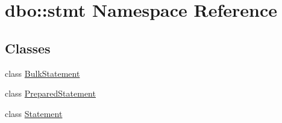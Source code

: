 \hypertarget{namespacedbo_1_1stmt}{\section{dbo\+:\+:stmt Namespace Reference}
\label{namespacedbo_1_1stmt}
}
\subsection*{Classes}
\begin{DoxyCompactItemize}
\item 
class \hyperlink{classdbo_1_1stmt_1_1_bulk_statement}{Bulk\+Statement}
\item 
class \hyperlink{classdbo_1_1stmt_1_1_prepared_statement}{Prepared\+Statement}
\item 
class \hyperlink{classdbo_1_1stmt_1_1_statement}{Statement}
\end{DoxyCompactItemize}
